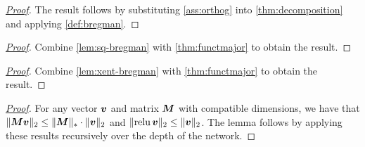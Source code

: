 \functmajor*
\begin{proof}[\mbox{\hyperref[thm:functmajor]{Proof}}]\label{proof:functmajor}
The result follows by substituting \cref{ass:orthog} into \cref{thm:decomposition} and applying \cref{def:bregman}.
\end{proof}

\sqmajor*
\begin{proof}[\mbox{\hyperref[lem:sq-major]{Proof}}]\label{proof:sqmajor} Combine \cref{lem:sq-bregman} with \cref{thm:functmajor} to obtain the result.
\end{proof}

\xentmajor*
\begin{proof}[\mbox{\hyperref[lem:xent-major]{Proof}}]\label{proof:xentmajor} Combine \cref{lem:xent-bregman} with \cref{thm:functmajor} to obtain the result.
\end{proof}

\outbound*
\begin{proof}[\mbox{\hyperref[lem:outbound]{Proof}}]\label{proof:outbound}
For any vector ${\bm{v}}$ and matrix ${\bm{M}}$ with compatible dimensions, we have that $\Vert {{\bm{M}}{\bm{v}}} \Vert_2 \leq \Vert {{\bm{M}}} \Vert_* \cdot \Vert {{\bm{v}}} \Vert_2$ and $\Vert {\operatorname{relu}{\bm{v}}} \Vert_2 \leq \Vert {{\bm{v}}} \Vert_2$. The lemma follows by applying these results recursively over the depth of the network.
\end{proof}

